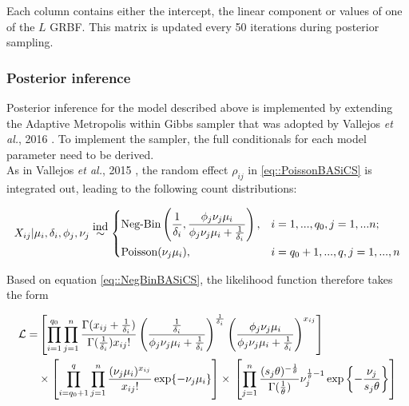 Each column contains either the intercept, the linear component or values of one of the $L$ GRBF. This matrix is updated every 50 iterations during posterior sampling.

\subsubsection{Posterior inference}

Posterior inference for the model described above is implemented by extending the Adaptive Metropolis within Gibbs sampler \citep{Roberts2009} that was adopted by Vallejos \emph{et al.}, 2016 \cite{Vallejos2016}. To implement the sampler, the full conditionals for each model parameter need to be derived. \\

As in Vallejos \emph{et al.}, 2015 \cite{Vallejos2015BASiCS}, the random effect $\rho_{ij}$ in \ref{eq::PoissonBASiCS} is integrated out, leading to the following count distributions:

\begin{equation} \label{eq::NegBinBASiCS}
 X_{ij}|\mu_i,\delta_i,\phi_j,\nu_j \stackrel{\mbox{ind}}{\sim}
 \left\lbrace
  \begin{aligned}
    &\text{Neg-Bin}\left(\frac{1}{\delta_i},\frac{\phi_j\nu_j\mu_i}{\phi_j\nu_j\mu_i+\frac{1}{\delta_i}}\right), && i=1,...,q_0,j=1,...n;  \\ 
    &\text{Poisson}(\nu_j\mu_i), && i=q_0+1,...,q,j=1,...,n        
  \end{aligned}
\right.
\end{equation}

Based on equation \eqref{eq::NegBinBASiCS}, the likelihood function therefore takes the form

\begin{align} \label{eq::loglik}
\mathcal{L} = & \left[\prod_{i=1}^{q_0}\prod_{j=1}^n\frac{\Gamma(x_{ij}+\frac{1}{\delta_i})}{\Gamma(\frac{1}{\delta_i})x_{ij}!}\left(\frac{\frac{1}{\delta_i}}{\phi_j\nu_j\mu_i+\frac{1}{\delta_i}}\right)^\frac{1}{\delta_i}\left(\frac{\phi_j\nu_j\mu_i}{\phi_j\nu_j\mu_i+\frac{1}{\delta_i}}\right)^{x_{ij}}\right] \nonumber\\ 
&\times\left[\prod_{i=q_0+1}^{q}\prod_{j=1}^n\frac{(\nu_j\mu_i)^{x_{ij}}}{x_{ij}!}\exp\lbrace-\nu_j\mu_i\rbrace\right]\times{}\left[\prod_{j=1}^n\frac{(s_j\theta)^{-\frac{1}{\theta}}}{\Gamma(\frac{1}{\theta})}\nu_j^{\frac{1}{\theta}-1}\exp\left\lbrace-\frac{\nu_j}{s_j\theta}\right\rbrace\right]
\end{align} 

